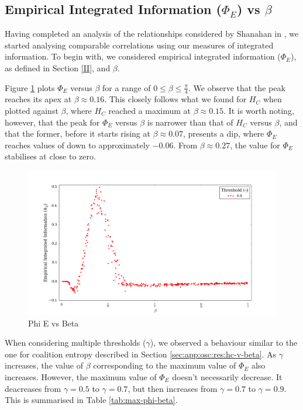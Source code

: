 \documentclass[a4paper,11pt]{article}
\begin{document}
\subsection{Empirical Integrated Information ($\Phi_{E}$) vs $\beta$}

Having completed an analysis of the relationships considered by Shanahan in \cite{Shanahan2010}, we started analysing comparable correlations using our measures of integrated information. To begin with, we considered empirical integrated information ($\Phi_{E}$), as defined in Section \ref{II}, and $\beta$.

Figure \ref{fig:phi-vs-beta-orig} plots $\Phi_{E}$ versus $\beta$ for a range of $0 \leq \beta \leq \frac{\pi}{4}$. We observe that the peak reaches its apex at $\beta \approx 0.16$. This closely follows what we found for $H_C$ when plotted against $\beta$, where $H_C$ reached a maximum at $\beta \approx 0.15$. It is worth noting, however, that the peak for $\Phi_{E}$ versus $\beta$ is narrower than that of $H_C$ versus $\beta$, and that the former, before it starts rising at $\beta \approx 0.07$, presents a dip, where $\Phi_{E}$ reaches values of down to approximately $-0.06$. From $\beta \approx 0.27$, the value for $\Phi_{E}$ stabilises at close to zero. 

\begin{figure}[H]
\begin{center}
\includegraphics[scale = 0.35]{figures/phi_vs_beta_orig}
\caption{
	Phi E vs Beta
	\label{fig:phi-vs-beta-orig}
}
\end{center}
\end{figure}

When considering multiple thresholds ($\gamma$), we observed a behaviour similar to the one for coalition entropy described in Section \ref{sec:app:osc:res:hc-v-beta}. As $\gamma$ increases, the value of $\beta$ corresponding to the maximum value of $\Phi_E$ also increases. However, the maximum value of $\Phi_E$ doesn't necessarily decrease. It deacreases from $\gamma = 0.5$ to $\gamma = 0.7$, but then increases from $\gamma = 0.7$ to $\gamma = 0.9$. This is summarised in Table \ref{tab:max-phi-beta}.
\end{document}
